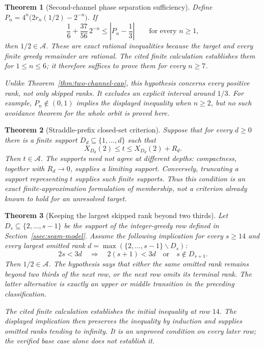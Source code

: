 \documentclass[11pt]{article}
\theoremstyle{plain}
\newtheorem{thm}{Theorem}[section]
\theoremstyle{definition}
\theoremstyle{remark}
\begin{document}
\begin{thm}[Second-channel phase separation sufficiency]
\label{thm:second-channel}
Define $P_n=4^n\bigl(2r_n(1/2)-2^{-n}\bigr)$.  If
\[
 \frac16+\frac{37}{56}\,2^{-n}\le
 \left|P_n-\frac13\right|\qquad\text{for every }n\ge1,
\]
then $1/2\in\mathcal A$.  These are exact rational inequalities because
the target and every finite greedy remainder are rational.  The cited
finite calculation establishes them for $1\le n\le6$; it therefore
suffices to prove them for every $n\ge7$.

Unlike Theorem~\ref{thm:two-channel-cap}, this hypothesis concerns every
positive rank, not only skipped ranks.  It excludes an explicit interval
around $1/3$.  For example, $P_n\notin(0,1)$ implies the displayed
inequality when $n\ge2$, but no such avoidance theorem for the whole
orbit is proved here.
\end{thm}

\begin{thm}[Straddle-prefix closed-set criterion]
\label{thm:straddle-closed-set}
Suppose that for every $d\ge0$ there is a finite support
$D_d\subseteq\{1,\ldots,d\}$ such that
\[
 X_{D_d}(2)\le t\le X_{D_d}(2)+R_d.
\]
Then $t\in\mathcal A$.  The supports need not agree at different depths:
compactness, together with $R_d\to0$, supplies a limiting support.
Conversely, truncating a support representing $t$ supplies such finite
supports.  Thus this condition is an exact finite-approximation
formulation of membership, not a criterion already known to hold for an
unresolved target.
\end{thm}

\begin{thm}[Keeping the largest skipped rank beyond two thirds]
\label{thm:largest-skip-late}
Let $D_s\subseteq\{2,\ldots,s-1\}$ be the support of the integer-greedy
row defined in Section~\ref{ssec:seam-model}.  Assume the following implication
for every $s\ge14$ and every largest omitted rank
$d=\max(\{2,\ldots,s-1\}\smallsetminus D_s)$:
\[
 2s<3d\quad\Longrightarrow\quad
 2(s+1)<3d\quad\text{or}\quad s\notin D_{s+1}.
\]
Then $1/2\in\mathcal A$.  The hypothesis says that either the same
omitted rank remains beyond two thirds of the next row, or the next
row omits its terminal rank.  The latter alternative is exactly an
upper or middle transition in the preceding classification.

The cited finite calculation establishes the initial inequality at
row $14$.  The displayed implication then preserves the inequality
by induction and supplies omitted ranks tending to infinity.
It is an unproved condition on every later row; the verified base
case alone does not establish it.
\end{thm}
\end{document}
